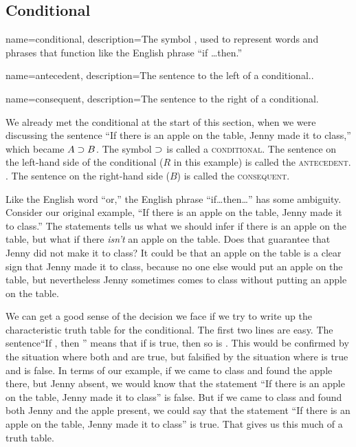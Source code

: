 \subsection{Conditional}

{
name=conditional,
description={The symbol \eif, used to represent words and phrases that function like the English phrase ``if \ldots then.''}
}

{
name=antecedent,
description={The sentence to the left of a conditional..}
}

{
name=consequent,
description={The sentence to the right of a conditional.}
}

We already met the conditional at the start of this section, when we were discussing the sentence ``If there is an apple on the table, Jenny made it to class,'' which became $A \supset B$. The symbol $\supset$ is called a \textsc{\gls{conditional}}. \label{def:conditional} The sentence on the left-hand side of the conditional ($R$ in this example) is called the \textsc{\gls{antecedent}}. \label{def:antecedent}.  The sentence on the right-hand side ($B$) is called the \textsc{\gls{consequent}}. \label{def:consequent} 
	
Like the English word ``or,'' the English phrase ``if\ldots then\ldots'' has some ambiguity. Consider our original example, ``If there is an apple on the table, Jenny made it to class.'' The statements tells us what we should infer if there is an apple on the table, but what if there \emph{isn't} an apple on the table. Does that guarantee that Jenny did not make it to class? It could be that an apple on the table is a clear sign that Jenny made it to class, because no one else would put an apple on the table, but nevertheless Jenny sometimes comes to class without putting an apple on the table. 

We can get a good sense of the decision we face if we try to write up the characteristic truth table for the conditional. The first two lines are easy. The sentence``If , then '' means that if  is true, then so is . This would be confirmed by the situation where both  and  are true, but falsified by the situation where  is true and  is false. In terms of our example, if we came to class and found the apple there, but Jenny absent, we would know that the statement ``If there is an apple on the table, Jenny made it to class'' is false. But if we came to class and found both Jenny and the apple present, we could say that the statement ``If there is an apple on the table, Jenny made it to class'' is true. That gives us this much of a truth table.


